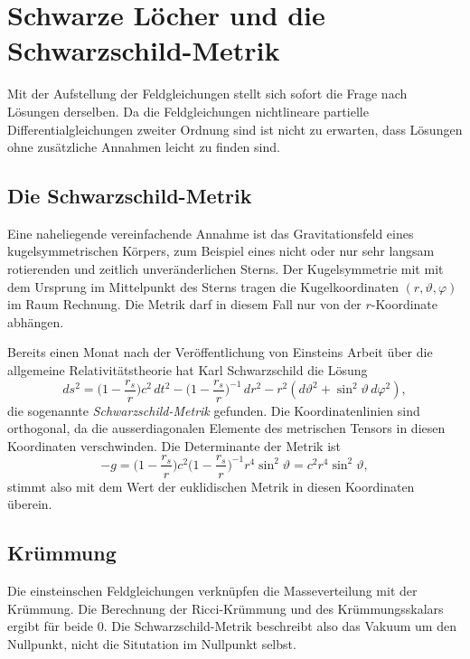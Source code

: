 %
%
\section{Schwarze Löcher und die Schwarzschild-Metrik
\label{buch:kruemmung:section:schwarzesloch}}
Mit der Aufstellung der Feldgleichungen stellt sich sofort die Frage
nach Lösungen derselben.
Da die Feldgleichungen nichtlineare partielle Differentialgleichungen
zweiter Ordnung sind ist nicht zu erwarten, dass Lösungen ohne
zusätzliche Annahmen leicht zu finden sind.

\subsection{Die Schwarzschild-Metrik}
Eine naheliegende vereinfachende Annahme ist das Gravitationsfeld
eines kugelsymmetrischen Körpers, zum Beispiel eines nicht oder nur
sehr langsam rotierenden und zeitlich unveränderlichen Sterns.
Der Kugelsymmetrie mit mit dem Ursprung im Mittelpunkt des Sterns
tragen die Kugelkoordinaten $(r,\vartheta,\varphi)$ im Raum Rechnung.
Die Metrik darf in diesem Fall nur von der $r$-Koordinate abhängen.

Bereits einen Monat nach der Veröffentlichung von Einsteins Arbeit
über die allgemeine Relativitätstheorie hat Karl Schwarzschild
%
die Lösung
\begin{equation}
ds^2
=
\biggl( 1-\frac{r_s}{r} \biggr)
c^2\,dt^2
-
\biggl(1-\frac{r_s}{r}\biggr)^{-1}
\,dr^2
-r^2 (d\vartheta^2 + \sin^2\vartheta\,d\varphi^2),
\label{buch:kruemmung:blackhole:eqn:schwarzschild}
\end{equation}
die sogenannte \emph{Schwarzschild-Metrik}
%
gefunden.
Die Koordinatenlinien sind orthogonal, da die ausserdiagonalen Elemente
des metrischen Tensors in diesen Koordinaten verschwinden.
Die Determinante der Metrik ist
\begin{equation}
-g
=
\biggl( 1-\frac{r_s}{r} \biggr)
c^2
\biggl(1-\frac{r_s}{r}\biggr)^{-1}
r^4 \sin^2\vartheta
=
c^2r^4\sin^2\vartheta,
\label{buch:kruemmung:schwarzesloch:eqn:g}
\end{equation}
stimmt also mit dem Wert der euklidischen Metrik in diesen Koordinaten
überein.

\subsection{Krümmung}
Die einsteinschen Feldgleichungen verknüpfen die Masseverteilung mit
der Krümmung.
Die Berechnung der Ricci-Krümmung und des Krümmungsskalars ergibt
für beide $0$.
Die Schwarzschild-Metrik beschreibt also das Vakuum um den Nullpunkt,
nicht die Situtation im Nullpunkt selbst.

